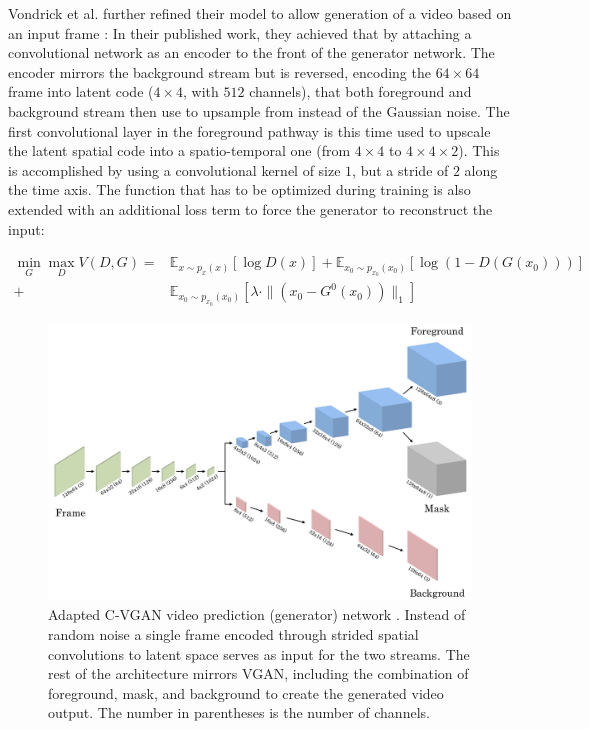 Vondrick et al. further refined their model to allow generation of a video based on an input frame \cite{vondrick2016generating}: In their published work, they achieved that by attaching a convolutional network as an encoder to the front of the generator network. The encoder mirrors the background stream but is reversed, encoding the $64 \times 64$ frame into latent code ($4 \times 4$, with $512$ channels), that both foreground and background stream then use to upsample from instead of the Gaussian noise. The first convolutional layer in the foreground pathway is this time used to upscale the latent spatial code into a spatio-temporal one (from $4 \times 4$ to $4 \times 4 \times 2$). This is accomplished by using a convolutional kernel of size $1$, but a stride of $2$ along the time axis. The function that has to be optimized during training is also extended with an additional loss term to force the generator to reconstruct the input:

\begin{equation} \label{eq:cvgan}
\begin{aligned}
\min_G \max_D V(D,G) = & \mathbb{E}_{x \sim p_x(x)}[\log D(x)] + \mathbb{E}_{x_0 \sim p_{x_0}(x_0)}[\log(1 - D(G(x_0)))] \\
+ & \mathbb{E}_{x_0 \sim p_{x_0}(x_0)}[\lambda \cdot \|(x_0 - G^0(x_0))\|_1]
\end{aligned}
\end{equation}

\begin{figure}
	\centering
  \includegraphics[width=1\textwidth]{graphics/gan/vgan/cvgan_1/cvgan_1.pdf}
  \caption[Adapted video prediction network ($n$ out of $1$ frames).]{Adapted C-VGAN video prediction (generator) network \cite{vondrick2016generating}. Instead of random noise a single frame encoded through strided spatial convolutions to latent space serves as input for the two streams. The rest of the architecture mirrors VGAN, including the combination of foreground, mask, and background to create the generated video output. The number in parentheses is the number of channels.}  
  \label{fig:cvgan_1}
\end{figure}

